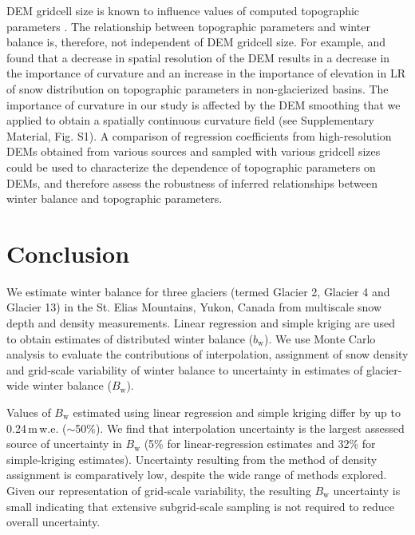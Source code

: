 \documentclass[twocolumn, letterpaper]{igs}
\begin{document}
DEM gridcell size is known to influence values of computed topographic parameters \citep{Zhang1994, Garbrecht1994, Guo-an2001, Lopez2010}. The relationship between topographic parameters and winter balance is, therefore, not independent of DEM gridcell size. For example, \cite{Kienzle2004} and \cite{Lopez2010} found that a decrease in spatial resolution of the DEM results in a decrease in the importance of curvature and an increase in the importance of elevation in LR of snow distribution on topographic parameters in non-glacierized basins. The importance of curvature in our study is affected by the DEM smoothing that we applied to obtain a spatially continuous curvature field (see Supplementary Material, Fig. S1). A comparison of regression coefficients from high-resolution DEMs obtained from various sources and sampled with various gridcell sizes could be used to characterize the dependence of topographic parameters on DEMs, and therefore assess the robustness of inferred relationships between winter balance and topographic parameters. 


\section{Conclusion}

We estimate winter balance for three glaciers (termed Glacier 2, Glacier 4 and Glacier 13) in the St. Elias Mountains, Yukon, Canada from multiscale snow depth and density measurements. Linear regression and simple kriging are used to obtain estimates of distributed winter balance ($b_\mathrm{w}$). We use Monte Carlo analysis to evaluate the contributions of interpolation, assignment of snow density and grid-scale variability of winter balance to uncertainty in estimates of glacier-wide winter balance ($B_\mathrm{w}$). 

Values of $B_\mathrm{w}$ estimated using linear regression and simple kriging differ by up to 0.24\,m\,w.e. ($\sim$50\%). We find that interpolation uncertainty is the largest assessed source of uncertainty in $B_\mathrm{w}$ (5\% for linear-regression estimates and 32\% for simple-kriging estimates). Uncertainty resulting from the method of density assignment is comparatively low, despite the wide range of methods explored. Given our representation of grid-scale variability, the resulting $B_\mathrm{w}$ uncertainty is small indicating that extensive subgrid-scale sampling is not required to reduce overall uncertainty. 
\end{document}
